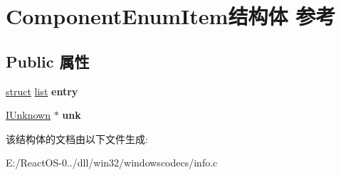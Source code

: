 \hypertarget{struct_component_enum_item}{}\section{Component\+Enum\+Item结构体 参考}
\label{struct_component_enum_item}
\subsection*{Public 属性}
\begin{DoxyCompactItemize}
\item 
\mbox{\label{struct_component_enum_item_abfe0295ec0af53df577a91b883d1e82d}} 
\hyperlink{interfacestruct}{struct} \hyperlink{classlist}{list} {\bfseries entry}
\item 
\mbox{\label{struct_component_enum_item_a88f2d5fbb1b7ad8912c7811f9fad8958}} 
\hyperlink{interface_i_unknown}{I\+Unknown} $\ast$ {\bfseries unk}
\end{DoxyCompactItemize}


该结构体的文档由以下文件生成\+:\begin{DoxyCompactItemize}
\item 
E\+:/\+React\+O\+S-\/0../dll/win32/windowscodecs/info.\+c\end{DoxyCompactItemize}
